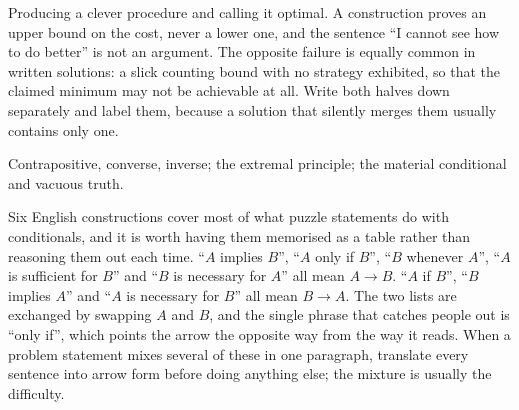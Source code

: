 \begin{trap}
Producing a clever procedure and calling it optimal. A construction proves an upper bound on the cost, never a lower one, and the sentence ``I cannot see how to do better'' is not an argument. The opposite failure is equally common in written solutions: a slick counting bound with no strategy exhibited, so that the claimed minimum may not be achievable at all. Write both halves down separately and label them, because a solution that silently merges them usually contains only one.
\end{trap}

\begin{seealsob}Contrapositive, converse, inverse; the extremal principle; the material conditional and vacuous truth.\end{seealsob}

\begin{keynote}
Six English constructions cover most of what puzzle statements do with conditionals, and it is worth having them memorised as a table rather than reasoning them out each time. ``$A$ implies $B$'', ``$A$ only if $B$'', ``$B$ whenever $A$'', ``$A$ is sufficient for $B$'' and ``$B$ is necessary for $A$'' all mean $A\to B$. ``$A$ if $B$'', ``$B$ implies $A$'' and ``$A$ is necessary for $B$'' all mean $B\to A$. The two lists are exchanged by swapping $A$ and $B$, and the single phrase that catches people out is ``only if'', which points the arrow the opposite way from the way it reads. When a problem statement mixes several of these in one paragraph, translate every sentence into arrow form before doing anything else; the mixture is usually the difficulty.
\end{keynote}

